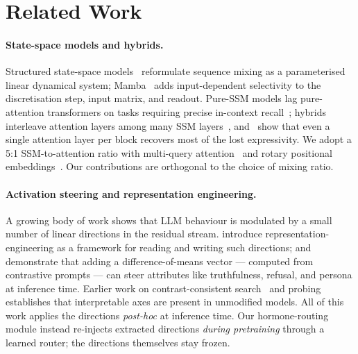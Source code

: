 \section{Related Work}
\label{sec:related}

\paragraph{State-space models and hybrids.}
Structured state-space models~\citep{gu2021combining,gu2022efficiently,gupta2022diagonal} reformulate sequence mixing as a parameterised linear dynamical system; Mamba~\citep{gu2023mamba} adds input-dependent selectivity to the discretisation step, input matrix, and readout. Pure-SSM models lag pure-attention transformers on tasks requiring precise in-context recall~\citep{jelassi2024repeat,arora2023zoology}; hybrids interleave attention layers among many SSM layers~\citep{lieber2024jamba,glorioso2024zamba}, and~\citet{park2024empirical} show that even a single attention layer per block recovers most of the lost expressivity. We adopt a 5:1 SSM-to-attention ratio with multi-query attention~\citep{shazeer2019fast} and rotary positional embeddings~\citep{su2021roformer}. Our contributions are orthogonal to the choice of mixing ratio.

\paragraph{Activation steering and representation engineering.}
A growing body of work shows that LLM behaviour is modulated by a small number of linear directions in the residual stream. \citet{zou2023representation} introduce representation-engineering as a framework for reading and writing such directions; \citet{turner2023activation} and \citet{rimsky2024steering} demonstrate that adding a difference-of-means vector --- computed from contrastive prompts --- can steer attributes like truthfulness, refusal, and persona at inference time. Earlier work on contrast-consistent search~\citep{burns2022discovering} and probing~\citep{alain2017understanding} establishes that interpretable axes are present in unmodified models. All of this work applies the directions \emph{post-hoc} at inference time. Our hormone-routing module instead re-injects extracted directions \emph{during pretraining} through a learned router; the directions themselves stay frozen.

